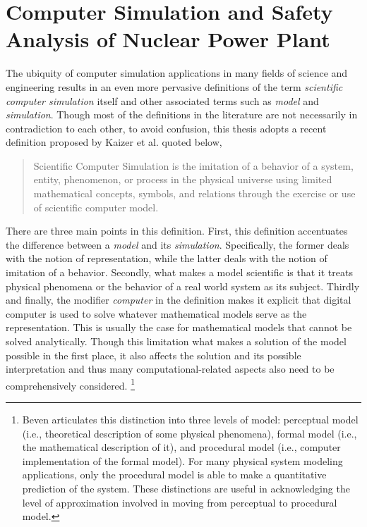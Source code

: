 \section{Computer Simulation and Safety Analysis of Nuclear Power Plant}\label{sec:intro_computer_simulation}

The ubiquity of computer simulation applications in many fields of science and engineering results in an even more pervasive definitions of the term \textit{scientific computer simulation} itself 
and other associated terms such as \textit{model} and \textit{simulation}.
Though most of the definitions in the literature are not necessarily in contradiction to each other, 
to avoid confusion, this thesis adopts a recent definition proposed by Kaizer et al.\cite{Kaizer2015} quoted below,

\begin{quote}
	Scientific Computer Simulation is the imitation of a behavior of a system, entity, phenomenon, or process in the physical universe 
	using limited mathematical concepts, symbols, and relations through the exercise or use of scientific computer model.
\end{quote}

There are three main points in this definition.
First, this definition accentuates the difference between a \emph{model} and its \emph{simulation}.
Specifically, the former deals with the notion of representation, while the latter deals with the notion of imitation of a behavior.
Secondly, what makes a model scientific is that it treats physical phenomena or the behavior of a real world system as its subject.
Thirdly and finally, the modifier \emph{computer} in the definition makes it explicit that digital computer is used to solve whatever mathematical models serve as the representation.
This is usually the case for mathematical models that cannot be solved analytically.
Though this limitation what makes a solution of the model possible in the first place, 
it also affects the solution and its possible interpretation and thus many computational-related aspects also need to be comprehensively considered.
\footnote{Beven \cite{Beven2009} articulates this distinction into three levels of model: perceptual model (i.e., theoretical description of some physical phenomena), formal model (i.e., the mathematical description of it), and procedural model  (i.e., computer implementation of the formal model). For many physical system modeling applications, only the procedural model is able to make a quantitative prediction of the system. These distinctions are useful in acknowledging the level of approximation involved in moving from perceptual to procedural model.}